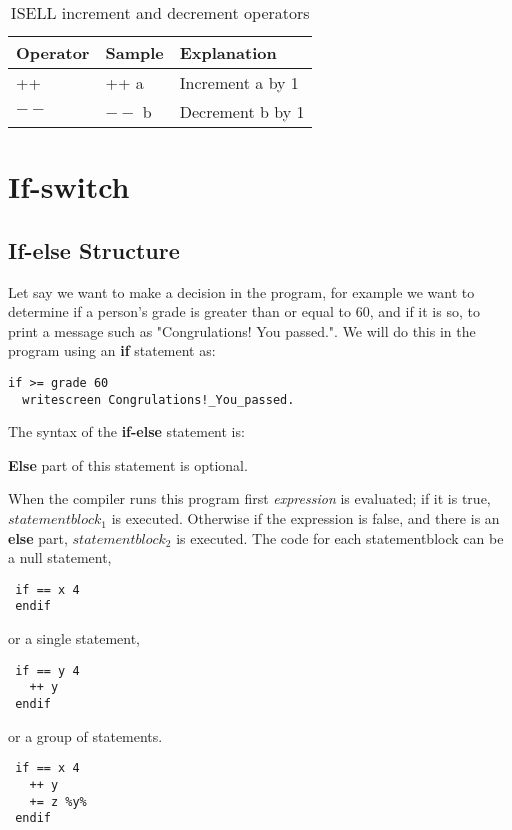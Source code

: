 \documentclass[a4paper,12pt]{book}
\begin{document}
\begin{table}[h!]
\begin{center}
\caption{ISELL increment and decrement operators}
\begin{tabular}{lll}
\hline
Operator & Sample & Explanation \\
\hline
++ & ++ a & Increment a by 1 \\
$--$ & $--$ b & Decrement b by 1 \\
\hline
\end{tabular}
\label{table_increment_decrement_operators}
\end{center}
\end{table}

\section{If-switch}

\subsection{If-else Structure}
\label{sec-if}

Let say we want to make a decision in the program, for example
we want to determine if a person's grade is greater than or equal to 60, and if it is so, to
print a message such as "Congrulations! You passed.".  We will do this in the program using an {\bf if}
statement as:
\begin{verbatim}
if >= grade 60
  writescreen Congrulations!_You_passed.
\end{verbatim}  
The syntax of the {\bf if-else} statement is:
\begin{center}
\end{center}

{\bf Else} part of this statement is optional.

When the compiler runs this program first {\em expression} is evaluated; if it is true,
$statementblock_1$ is executed.  Otherwise if the expression is false, and there is an {\bf else} part, $statementblock_2$ is executed.
The code for each statementblock can be a null statement,
\begin{verbatim}
 if == x 4
 endif
\end{verbatim}  
or a single statement,
\begin{verbatim}
 if == y 4
   ++ y
 endif
\end{verbatim}
or a group of statements.
\begin{verbatim}
 if == x 4
   ++ y
   += z %y%
 endif
\end{verbatim}
\end{document}
